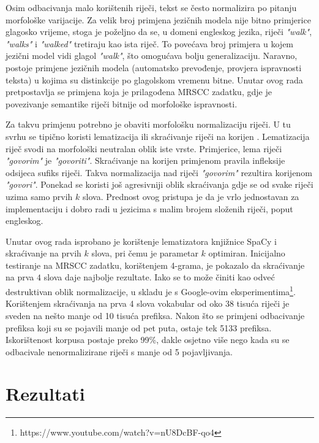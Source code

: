 \documentclass[times, utf8, diplomski, numeric]{fer}
\begin{document}
Osim odbacivanja malo korištenih riječi, tekst se često normalizira po pitanju morfološke varijacije. Za velik broj primjena jezičnih modela nije bitno primjerice glagosko vrijeme, stoga je poželjno da se, u domeni engleskog jezika, riječi \textit{"walk"}, \textit{"walks"} i \textit{"walked"} tretiraju kao ista riječ. To povećava broj primjera u kojem jezični model vidi glagol \textit{"walk"}, što omogućava bolju generalizaciju. Naravno, postoje primjene jezičnih modela (automatsko prevođenje, provjera ispravnosti teksta) u kojima su distinkcije po glagolskom vremenu bitne. Unutar ovog rada pretpostavlja se primjena koja je prilagođena MRSCC zadatku, gdje je povezivanje semantike riječi bitnije od morfološke ispravnosti.

 Za takvu primjenu potrebno je obaviti morfološku normalizaciju riječi. U tu svrhu se tipično koristi lematizacija  ili skraćivanje riječi na korijen . Lematizacija riječ svodi na morfološki neutralan oblik iste vrste. Primjerice, lema riječi \textit{"govorim"} je \textit{"govoriti"}. Skraćivanje na korijen primjenom pravila infleksije odsijeca sufiks riječi. Takva normalizacija nad riječi \textit{"govorim"} rezultira korijenom \textit{"govori"}. Ponekad se koristi još agresivniji oblik skraćivanja gdje se od svake riječi uzima samo prvih $k$ slova. Prednost ovog pristupa je da je vrlo jednostavan za implementaciju i dobro radi u jezicima s malim brojem složenih riječi, poput engleskog.

 Unutar ovog rada isprobano je korištenje lematizatora knjižnice SpaCy i skraćivanje na prvih $k$ slova, pri čemu je parametar $k$ optimiran. Inicijalno testiranje na MRSCC zadatku, korištenjem 4-grama, je pokazalo da skraćivanje na prva $4$ slova daje najbolje rezultate. Iako se to može činiti kao odveć destruktivan oblik normalizacije, u skladu je s Google-ovim eksperimentima\footnote{https://www.youtube.com/watch?v=nU8DcBF-qo4}. Korištenjem skraćivanja na prva 4 slova vokabular od oko 38 tisuća riječi je sveden na nešto manje od 10 tisuća prefiksa. Nakon što se primjeni odbacivanje prefiksa koji su se pojavili manje od pet puta, ostaje tek 5133 prefiksa. Iskorištenost korpusa postaje preko 99\%, dakle osjetno više nego kada su se odbacivale nenormalizirane riječi s manje od 5 pojavljivanja.


\section{Rezultati}
\end{document}
